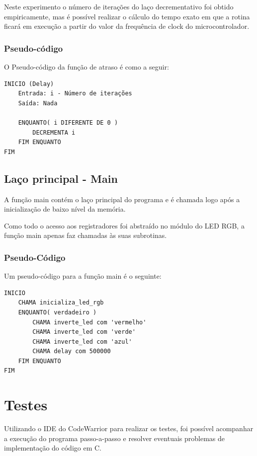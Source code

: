\documentclass{article}
\begin{document}
Neste experimento o número de iterações do laço decrementativo foi obtido empiricamente, mas é possível realizar o cálculo do tempo exato em que a rotina ficará em execução a partir do valor da frequência de clock do microcontrolador.

\subsubsection{Pseudo-código}

O Pseudo-código da função de atraso é como a seguir:

\begin{verbatim}
INICIO (Delay)
    Entrada: i - Número de iterações
    Saída: Nada

    ENQUANTO( i DIFERENTE DE 0 )
        DECREMENTA i
    FIM ENQUANTO
FIM
\end{verbatim}

\subsection{Laço principal - Main}

A função main contém o laço principal do programa e é chamada logo após a inicialização de baixo nível da memória.

Como todo o acesso aos registradores foi abstraído no módulo do LED RGB, a função main apenas faz chamadas às suas subrotinas.

\subsubsection{Pseudo-Código}
Um pseudo-código para a função main é o seguinte:

\begin{verbatim}
INICIO
    CHAMA inicializa_led_rgb
    ENQUANTO( verdadeiro )
        CHAMA inverte_led com 'vermelho'
        CHAMA inverte_led com 'verde'
        CHAMA inverte_led com 'azul'
        CHAMA delay com 500000
    FIM ENQUANTO
FIM
\end{verbatim}

\section{Testes}

Utilizando o IDE do CodeWarrior para realizar os testes, foi possível acompanhar a execução do programa passo-a-passo e resolver eventuais problemas de implementação do código em C.
\end{document}
